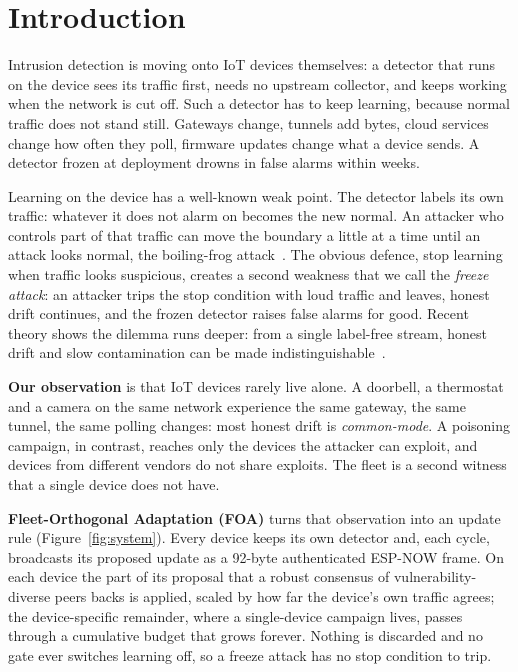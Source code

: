 \section{Introduction}

Intrusion detection is moving onto IoT devices themselves: a detector that runs on the device sees its
traffic first, needs no upstream collector, and keeps working when the network is cut off. Such a
detector has to keep learning, because normal traffic does not stand still. Gateways change, tunnels add
bytes, cloud services change how often they poll, firmware updates change what a device sends. A
detector frozen at deployment drowns in false alarms within weeks.

Learning on the device has a well-known weak point. The detector labels its own traffic: whatever it
does not alarm on becomes the new normal. An attacker who controls part of that traffic can move the
boundary a little at a time until an attack looks normal, the boiling-frog attack~\cite{antidote,kloft}.
The obvious defence, stop learning when traffic looks suspicious, creates a second weakness that we
call the \emph{freeze attack}: an attacker trips the stop condition with loud traffic and leaves, honest
drift continues, and the frozen detector raises false alarms for good. Recent theory shows the dilemma
runs deeper: from a single label-free stream, honest drift and slow contamination can be made
indistinguishable~\cite{warden,capture}.

\textbf{Our observation} is that IoT devices rarely live alone. A doorbell, a thermostat and a camera on
the same network experience the same gateway, the same tunnel, the same polling changes: most honest
drift is \emph{common-mode}. A poisoning campaign, in contrast, reaches only the devices the attacker
can exploit, and devices from different vendors do not share exploits. The fleet is a second witness
that a single device does not have.

\textbf{Fleet-Orthogonal Adaptation (FOA)} turns that observation into an update rule
(Figure~\ref{fig:system}). Every device keeps its own detector and, each cycle, broadcasts its proposed
update as a 92-byte authenticated ESP-NOW frame. On each device the part of its proposal that a robust
consensus of vulnerability-diverse peers backs is applied, scaled by how far the device's own traffic
agrees; the device-specific remainder,
where a single-device campaign lives, passes through a cumulative budget that grows forever. Nothing is
discarded and no gate ever switches learning off, so a freeze attack has no stop condition to trip.

